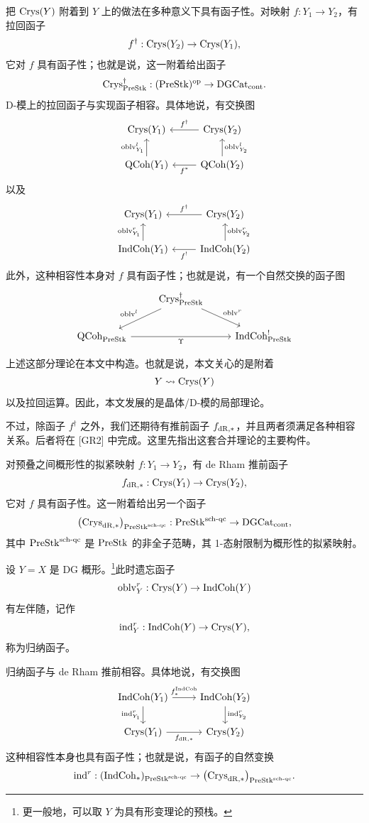 把 $\mathrm{Crys}(Y)$ 附着到 $Y$ 上的做法在多种意义下具有函子性。对映射 $f:Y_1\to Y_2$，有拉回函子
\[
f^\dagger:\mathrm{Crys}(Y_2)\to\mathrm{Crys}(Y_1),
\]
它对 $f$ 具有函子性；也就是说，这一附着给出函子
\[
\mathrm{Crys}^\dagger_{\mathrm{PreStk}}:(\mathrm{PreStk})^{\mathrm{op}}\to\mathrm{DGCat}_{\mathrm{cont}}.
\]
D-模上的拉回函子与实现函子相容。具体地说，有交换图
\[
\begin{tikzcd}
 \Crys(Y_1) & \Crys(Y_2) \arrow[l, "f^\dagger"'] \\
 \QCoh(Y_1) \arrow[u, "\oblv^l_{Y_1}"] & \QCoh(Y_2) \arrow[l, "f^*"] \arrow[u, "\oblv^l_{Y_2}"']
\end{tikzcd}
\]
以及
\[
\begin{tikzcd}
 \Crys(Y_1) & \Crys(Y_2) \arrow[l, "f^\dagger"'] \\
 \IndCoh(Y_1) \arrow[u, "\oblv^r_{Y_1}"] & \IndCoh(Y_2) \arrow[l, "f^!"] \arrow[u, "\oblv^r_{Y_2}"']
\end{tikzcd}
\]
此外，这种相容性本身对 $f$ 具有函子性；也就是说，有一个自然交换的函子图
\[
\begin{tikzcd}
 & \Crys^\dagger_{\PreStk} \arrow[dl, "\oblv^l"'] \arrow[dr, "\oblv^r"] & \\
 \QCoh_{\PreStk} \arrow[rr, "\Upsilon"'] & & \IndCoh^!_{\PreStk}
\end{tikzcd}
\]

上述这部分理论在本文中构造。也就是说，本文关心的是附着
\[
Y\rightsquigarrow\mathrm{Crys}(Y)
\]
以及拉回运算。因此，本文发展的是晶体/D-模的局部理论。

不过，除函子 $f^\dagger$ 之外，我们还期待有推前函子 $f_{\mathrm{dR},*}$，并且两者须满足各种相容关系。后者将在 [GR2] 中完成。这里先指出这套合并理论的主要构件。

对预叠之间概形性的拟紧映射 $f:Y_1\to Y_2$，有 de Rham 推前函子
\[
f_{\mathrm{dR},*}:\mathrm{Crys}(Y_1)\to\mathrm{Crys}(Y_2),
\]
它对 $f$ 具有函子性。这一附着给出另一个函子
\[
\big(\mathrm{Crys}_{\mathrm{dR},*}\big)_{\mathrm{PreStk}^{\mathrm{sch\text{-}qc}}}:\mathrm{PreStk}^{\mathrm{sch\text{-}qc}}\to\mathrm{DGCat}_{\mathrm{cont}},
\]
其中 $\mathrm{PreStk}^{\mathrm{sch\text{-}qc}}$ 是 $\mathrm{PreStk}$ 的非全子范畴，其 1-态射限制为概形性的拟紧映射。

设 $Y=X$ 是 DG 概形。\footnote{更一般地，可以取 $Y$ 为具有形变理论的预栈。}此时遗忘函子
\[
\mathrm{oblv}^r_Y:\mathrm{Crys}(Y)\to\mathrm{IndCoh}(Y)
\]
有左伴随，记作
\[
\mathrm{ind}^r_Y:\mathrm{IndCoh}(Y)\to\mathrm{Crys}(Y),
\]
称为归纳函子。

归纳函子与 de Rham 推前相容。具体地说，有交换图
\[
\begin{tikzcd}
 \IndCoh(Y_1) \arrow[r, "f^{\IndCoh}_*"] \arrow[d, "\indf^r_{Y_1}"'] & \IndCoh(Y_2) \arrow[d, "\indf^r_{Y_2}"] \\
 \Crys(Y_1) \arrow[r, "f_{\dR,*}"'] & \Crys(Y_2)
\end{tikzcd}
\]
这种相容性本身也具有函子性；也就是说，有函子的自然变换
\[
\mathrm{ind}^r:(\mathrm{IndCoh}_*)_{\mathrm{PreStk}^{\mathrm{sch\text{-}qc}}}\to\big(\mathrm{Crys}_{\mathrm{dR},*}\big)_{\mathrm{PreStk}^{\mathrm{sch\text{-}qc}}}.
\]

